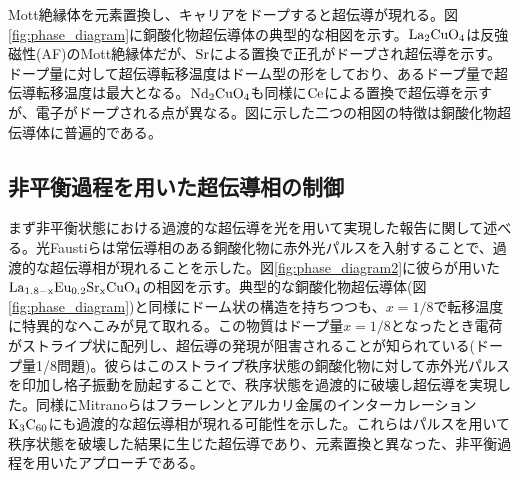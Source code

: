 Mott絶縁体を元素置換し、キャリアをドープすると超伝導が現れる。図\ref{fig:phase_diagram}に銅酸化物超伝導体の典型的な相図を示す\cite{Andrea2003}。$\rm La_2CuO_4$は反強磁性(AF)のMott絶縁体だが、$\rm Sr$による置換で正孔がドープされ超伝導を示す。ドープ量に対して超伝導転移温度はドーム型の形をしており、あるドープ量で超伝導転移温度は最大となる。$\rm Nd_2CuO_4$も同様に$\rm Ce$による置換で超伝導を示すが、電子がドープされる点が異なる。図に示した二つの相図の特徴は銅酸化物超伝導体に普遍的である\cite{Lee2006}。

\subsection{非平衡過程を用いた超伝導相の制御}
まず非平衡状態における過渡的な超伝導を光を用いて実現した報告に関して述べる。光Faustiらは常伝導相のある銅酸化物に赤外光パルスを入射することで、過渡的な超伝導相が現れることを示した\cite{Fausti,Hunt2015}。図\ref{fig:phase_diagram2}に彼らが用いた$\rm La_{1.8-x}Eu_{0.2}Sr_{x}CuO_4$の相図を示す\cite{Cavalleri2018}。典型的な銅酸化物超伝導体(図\ref{fig:phase_diagram})と同様にドーム状の構造を持ちつつも、$x=1/8$で転移温度に特異的なへこみが見て取れる。この物質はドープ量$x=1/8$となったとき電荷がストライプ状に配列し、超伝導の発現が阻害されることが知られている(ドープ量1/8問題)。彼らはこのストライプ秩序状態の銅酸化物に対して赤外光パルスを印加し格子振動を励起することで、秩序状態を過渡的に破壊し超伝導を実現した。同様にMitranoらはフラーレンとアルカリ金属のインターカレーション$\rm K_3C_{60}$にも過渡的な超伝導相が現れる可能性を示した\cite{Mitrano2016}。これらはパルスを用いて秩序状態を破壊した結果に生じた超伝導であり、元素置換と異なった、非平衡過程を用いたアプローチである。
